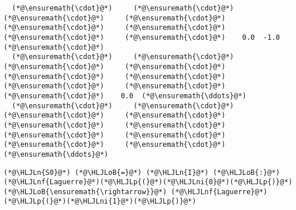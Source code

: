 \documentclass[12pt,a4paper]{article}
\newcommand{\HLJLn}[1]{#1}
\newcommand{\HLJLnf}[1]{\textcolor[RGB]{66,102,213}{#1}}
\newcommand{\HLJLni}[1]{\textcolor[RGB]{59,151,46}{#1}}
\newcommand{\HLJLoB}[1]{\textcolor[RGB]{102,102,102}{\textbf{#1}}}
\newcommand{\HLJLp}[1]{#1}
\begin{document}
\begin{lstlisting}
  (*@\ensuremath{\cdot}@*)     (*@\ensuremath{\cdot}@*)     (*@\ensuremath{\cdot}@*)     (*@\ensuremath{\cdot}@*)     (*@\ensuremath{\cdot}@*)     (*@\ensuremath{\cdot}@*)     (*@\ensuremath{\cdot}@*)     (*@\ensuremath{\cdot}@*)    0.0  -1.0  (*@\ensuremath{\cdot}@*)
  (*@\ensuremath{\cdot}@*)     (*@\ensuremath{\cdot}@*)     (*@\ensuremath{\cdot}@*)     (*@\ensuremath{\cdot}@*)     (*@\ensuremath{\cdot}@*)     (*@\ensuremath{\cdot}@*)     (*@\ensuremath{\cdot}@*)     (*@\ensuremath{\cdot}@*)     (*@\ensuremath{\cdot}@*)    0.0  (*@\ensuremath{\ddots}@*)
  (*@\ensuremath{\cdot}@*)     (*@\ensuremath{\cdot}@*)     (*@\ensuremath{\cdot}@*)     (*@\ensuremath{\cdot}@*)     (*@\ensuremath{\cdot}@*)     (*@\ensuremath{\cdot}@*)     (*@\ensuremath{\cdot}@*)     (*@\ensuremath{\cdot}@*)     (*@\ensuremath{\cdot}@*)     (*@\ensuremath{\cdot}@*)   (*@\ensuremath{\ddots}@*)
\end{lstlisting}


\begin{lstlisting}
(*@\HLJLn{S0}@*) (*@\HLJLoB{=}@*) (*@\HLJLn{I}@*) (*@\HLJLoB{:}@*) (*@\HLJLnf{Laguerre}@*)(*@\HLJLp{(}@*)(*@\HLJLni{0}@*)(*@\HLJLp{)}@*) (*@\HLJLoB{\ensuremath{\rightarrow}}@*) (*@\HLJLnf{Laguerre}@*)(*@\HLJLp{(}@*)(*@\HLJLni{1}@*)(*@\HLJLp{)}@*)
\end{lstlisting}
\end{document}
